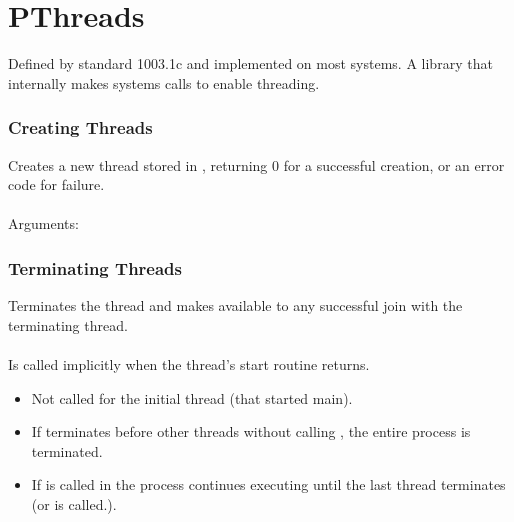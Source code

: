 \documentclass{report}
\begin{document}
    \section*{PThreads}
        
        Defined by  standard 1003.1c and implemented on most  systems. A library that internally makes systems calls to enable threading.
        
        
        \subsubsection*{Creating Threads}
            
            Creates a new thread stored in , returning $0$ for a successful creation, or an error code for failure.
            \\ 
            \\ Arguments:
            \begin{itemize}
            \end{itemize}
        \subsubsection*{Terminating Threads}
            
            Terminates the thread and makes  available to any successful join with the terminating thread.
            \\
            \\ Is called implicitly when the thread's start routine returns.
            \begin{itemize}
                \item Not called for the initial thread (that started main).
                \item If  terminates before other threads without calling , the entire process is terminated.
                \item If  is called in  the process continues executing until the last thread terminates (or  is called.).
            \end{itemize}
            
        
\end{document}

